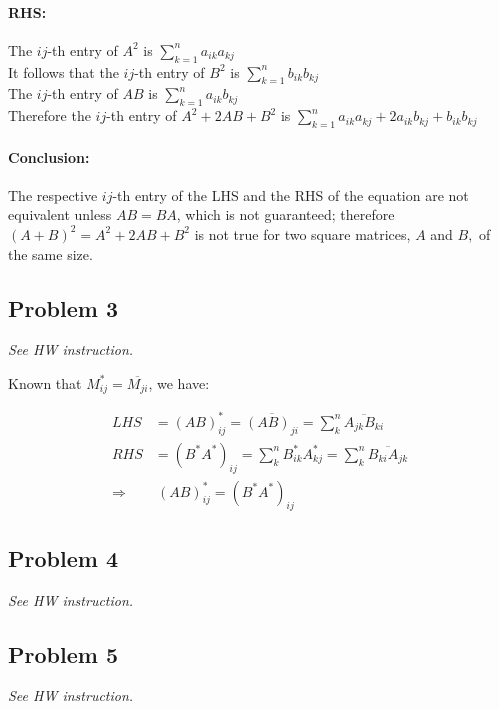 \documentclass[11pt]{article}
\begin{document}
\paragraph*{RHS:}
The $ij$-th entry of $A^2$ is $\sum_{k=1}^n a_{ik}a_{kj}$\\
It follows that the $ij$-th entry of $B^2$ is $\sum_{k=1}^n b_{ik}b_{kj}$\\
The $ij$-th entry of $AB$ is $\sum_{k=1}^n a_{ik}b_{kj}$\\
Therefore the $ij$-th entry of $A^2+2AB+B^2$ is $\sum_{k=1}^n a_{ik}a_{kj} + 2a_{ik}b_{kj}+ b_{ik}b_{kj}$
\paragraph*{Conclusion:}
The respective $ij$-th entry of the LHS and the RHS of the equation are not equivalent unless $AB = BA$, which is not guaranteed; therefore $(A+B)^2=A^2+2AB+B^2$ is not true for two square matrices, $A$ and $B,$ of the same size.


\subsection*{Problem 3}
\textit{See HW instruction.}\newline

Known that $M_{ij}^* = \overline{M_{ji}}$, we have:

\begin{align*}
    LHS &= (AB)^*_{ij} = \overline{(AB)_{ji}} = \sum^{n}_{k} \overline{A_{jk} B_{ki}} \\
    RHS &= (B^* A^*)_{ij} = \sum^{n}_{k} B^{*}_{ik} A^{*}_{kj} = \sum^{n}_{k} \overline{B_{ki} A_{jk}} \\
    \Longrightarrow& \  (AB)^*_{ij} = (B^* A^*)_{ij}
\end{align*}

\subsection*{Problem 4}
\textit{See HW instruction.}\newline


\subsection*{Problem 5}
\textit{See HW instruction.}\newline
\end{document}
